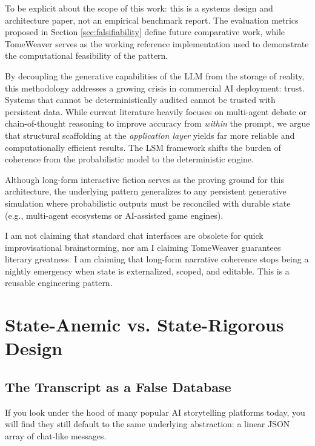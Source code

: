 \documentclass[12pt, a4paper]{article}
\begin{document}
To be explicit about the scope of this work: this is a systems design and architecture paper, not an empirical benchmark report. The evaluation metrics proposed in Section \ref{sec:falsifiability} define future comparative work, while TomeWeaver serves as the working reference implementation used to demonstrate the computational feasibility of the pattern.

By decoupling the generative capabilities of the LLM from the storage of reality, this methodology addresses a growing crisis in commercial AI deployment: trust. Systems that cannot be deterministically audited cannot be trusted with persistent data. While current literature heavily focuses on multi-agent debate or chain-of-thought reasoning to improve accuracy from \textit{within} the prompt, we argue that structural scaffolding at the \textit{application layer} yields far more reliable and computationally efficient results. The LSM framework shifts the burden of coherence from the probabilistic model to the deterministic engine.

Although long-form interactive fiction serves as the proving ground for this architecture, the underlying pattern generalizes to any persistent generative simulation where probabilistic outputs must be reconciled with durable state (e.g., multi-agent ecosystems or AI-assisted game engines).

I am not claiming that standard chat interfaces are obsolete for quick improvisational brainstorming, nor am I claiming TomeWeaver guarantees literary greatness. I am claiming that long-form narrative coherence stops being a nightly emergency when state is externalized, scoped, and editable. This is a reusable engineering pattern.



\newpage
\section{State-Anemic vs. State-Rigorous Design}
\label{sec:crisis}

\subsection{The Transcript as a False Database}

If you look under the hood of many popular AI storytelling platforms today, you will find they still default to the same underlying abstraction: a linear JSON array of chat-like messages. 
\end{document}
